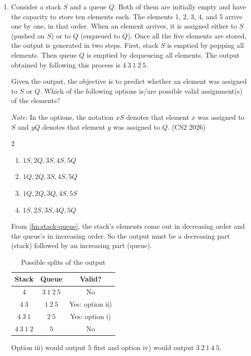 \begin{enumerate}[label=\thesubsection.\arabic*, ref=\thesubsection.\theenumi]
The following code verifies the solution.
\begin{lstlisting}
codes/crc.c
\end{lstlisting}

\item Consider a stack $S$ and a queue $Q$. Both of them are initially
empty and have the capacity to store ten elements each. The elements 1, 2,
3, 4, and 5 arrive one by one, in that order. When an element arrives, it
is assigned either to $S$ (pushed on $S$) or to $Q$ (enqueued to $Q$). Once
all the five elements are stored, the output is generated in two steps.
First, stack $S$ is emptied by popping all elements. Then queue $Q$ is
emptied by dequeueing all elements. The output obtained by following this
process is $4\ 3\ 1\ 2\ 5$.

Given the output, the objective is to predict whether an element was
assigned to $S$ or $Q$. Which of the following options is/are possible
valid assignment(s) of the elements?

\textit{Note:} In the options, the notation $xS$ denotes that element $x$
was assigned to $S$ and $yQ$ denotes that element $y$ was assigned to $Q$.
\hfill (CS2 2026)
\begin{multicols}{2}
\begin{enumerate}[label=\roman*)]
  \item $1S, 2Q, 3S, 4S, 5Q$
  \item $1Q, 2Q, 3S, 4S, 5Q$
  \item $1Q, 2Q, 3Q, 4S, 5S$
  \item $1S, 2S, 3S, 4Q, 5Q$
\end{enumerate}
\end{multicols}
\solution From \ref{fm:stack-queue}, the stack's elements come out in
decreasing order and the queue's in increasing order. So the output must
be a decreasing part (stack) followed by an increasing part (queue).
\begin{table}[H]
\centering
\begin{tabular}{|c|c|c|}
\hline
\textbf{Stack} & \textbf{Queue} & \textbf{Valid?} \\
\hline
$4$ & $3\ 1\ 2\ 5$ & No \\
$4\ 3$ & $1\ 2\ 5$ & Yes: option ii) \\
$4\ 3\ 1$ & $2\ 5$ & Yes: option i) \\
$4\ 3\ 1\ 2$ & $5$ & No \\
\hline
\end{tabular}
\caption{Possible splits of the output}
\end{table}
Option iii) would output $5$ first and option iv) would output
$3\ 2\ 1\ 4\ 5$.


\end{enumerate}
